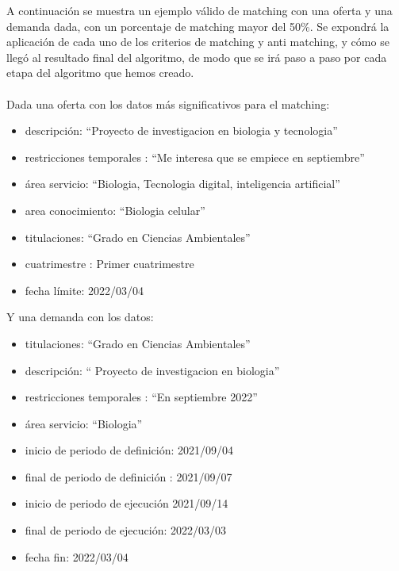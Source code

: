 \documentclass[11pt]{book}
\begin{document}
A continuación se muestra un ejemplo válido de matching con una oferta y una demanda dada, con un porcentaje de matching mayor del 50\%. Se expondrá la aplicación de cada uno de los criterios de matching y anti matching, y cómo se llegó al resultado final del algoritmo, de modo que se irá paso a paso por cada etapa del algoritmo que hemos creado.\\\\
Dada una oferta con los datos más significativos para el matching:\\
\begin{itemize} 
	\item descripción: “Proyecto de investigacion en biologia y tecnologia”
	\item restricciones temporales : “Me interesa que se empiece en septiembre”
	\item área servicio: “Biologia, Tecnologia digital, inteligencia artificial”
	\item  area conocimiento: “Biologia celular”
	\item titulaciones: “Grado en Ciencias Ambientales”
	\item cuatrimestre : Primer cuatrimestre
	\item  fecha límite: 2022/03/04
	\\
\end{itemize}
Y una demanda con los datos:\\
\begin{itemize} 
	\item titulaciones: “Grado en Ciencias Ambientales”
	\item descripción: “ Proyecto de investigacion en biologia”
	\item restricciones temporales : “En septiembre 2022”
	\item área servicio: “Biologia”
	\item inicio de periodo de definición: 2021/09/04
	\item final de periodo de definición : 2021/09/07
	\item inicio de periodo de ejecución 2021/09/14
	\item final de periodo de ejecución: 2022/03/03
	\item fecha fin: 2022/03/04
\end{itemize}
\end{document}
